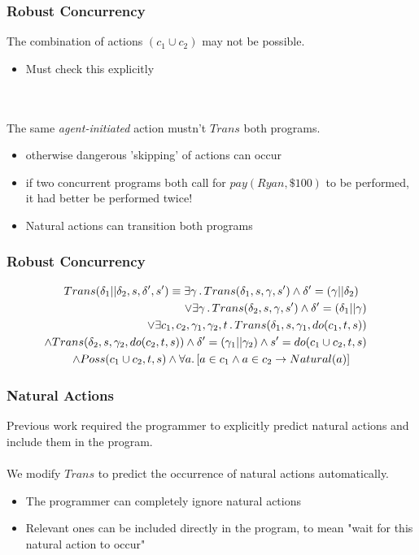 \documentclass[compress]{beamer}
\begin{document}
\begin{frame}
\frametitle{Robust Concurrency}
The combination of actions $(c_1\cup c_2)$ may not be possible.
\begin{itemize}
  \item Must check this explicitly
\end{itemize}
\ \\
\ \\
The same \emph{agent-initiated} action mustn't $Trans$ both programs.
\begin{itemize}
  \item otherwise dangerous 'skipping' of actions can occur
  \item if two concurrent programs both call for $pay(Ryan,\$100)$ to be performed, it had better be performed twice!
  \item Natural actions can transition both programs
\end{itemize}
\end{frame}

\begin{frame}
\frametitle{Robust Concurrency}
\begin{multline*}
Trans(\delta_{1}||\delta_{2},s,\delta',s')\equiv\exists\gamma\,.\, Trans(\delta_{1},s,\gamma,s')\wedge\delta'=(\gamma||\delta_{2})\\
\shoveright{\vee\exists\gamma\,.\, Trans(\delta_{2},s,\gamma,s')\wedge\delta'=(\delta_{1}||\gamma)}\\
\shoveright{\vee\exists c_{1},c_{2},\gamma_{1},\gamma_{2},t\,.\, Trans(\delta_{1},s,\gamma_{1},do(c_{1},t,s))}\\
\shoveright{\wedge Trans(\delta_{2},s,\gamma_{2},do(c_{2},t,s))\wedge\delta'=(\gamma_1||\gamma_2)\wedge s'=do(c_1\cup c_2,t,s)}\\
\wedge Poss(c_1\cup c_2,t,s)\wedge\forall a.\left[a\in c_{1}\wedge a\in c_{2}\rightarrow Natural(a)\right]
\end{multline*}
\end{frame}

\begin{frame}
\frametitle{Natural Actions}
Previous work required the programmer to explicitly predict natural actions
and include them in the program.
\ \\
\ \\
We modify $Trans$ to predict the occurrence of natural actions automatically.
\begin{itemize}
  \item The programmer can completely ignore natural actions
  \item Relevant ones can be included directly in the program, to mean "wait for this natural action to occur"
\end{itemize}
\end{frame}
\end{document}
